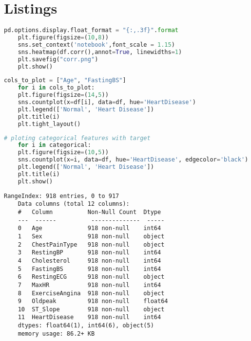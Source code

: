 \chapter{Listings}

\begin{lstlisting}[language=Python, caption={Correlation chart}, label={lst:corr}]
	pd.options.display.float_format = "{:,.3f}".format
	plt.figure(figsize=(10,8))
	sns.set_context('notebook',font_scale = 1.15)
	sns.heatmap(df.corr(),annot=True, linewidths=1)
	plt.savefig("corr.png")
	plt.show()
\end{lstlisting}

\begin{lstlisting}[language=Python, caption={Plotting select numerical features with target column}, label={lst:plot-numerical}]
	cols_to_plot = ["Age", "FastingBS"]
	for i in cols_to_plot:
	plt.figure(figsize=(14,5))
	sns.countplot(x=df[i], data=df, hue='HeartDisease')
	plt.legend(['Normal', 'Heart Disease'])
	plt.title(i)
	plt.tight_layout()
\end{lstlisting}

\begin{lstlisting}[language=Python, caption={Plotting categorical values}, label={lst:plot-categorical}]
	# ploting categorical features with target
	for i in categorical:
	plt.figure(figsize=(10,5))
	sns.countplot(x=i, data=df, hue='HeartDisease', edgecolor='black')
	plt.legend(['Normal', 'Heart Disease'])
	plt.title(i)
	plt.show()
\end{lstlisting}

\begin{lstlisting}[numbers=none, label={lst:dataset-info-output}, caption={Dataset information}]
	RangeIndex: 918 entries, 0 to 917
	Data columns (total 12 columns):
	#   Column          Non-Null Count  Dtype  
	---  ------          --------------  -----  
	0   Age             918 non-null    int64  
	1   Sex             918 non-null    object 
	2   ChestPainType   918 non-null    object 
	3   RestingBP       918 non-null    int64  
	4   Cholesterol     918 non-null    int64  
	5   FastingBS       918 non-null    int64  
	6   RestingECG      918 non-null    object 
	7   MaxHR           918 non-null    int64  
	8   ExerciseAngina  918 non-null    object 
	9   Oldpeak         918 non-null    float64
	10  ST_Slope        918 non-null    object 
	11  HeartDisease    918 non-null    int64  
	dtypes: float64(1), int64(6), object(5)
	memory usage: 86.2+ KB
\end{lstlisting}

